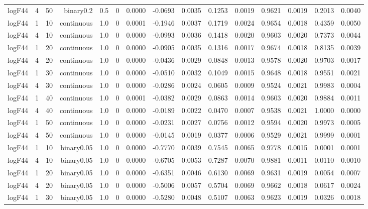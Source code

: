 \begin{longtable}{rrrrrrrrrrrrrrr}
  logF44 & 4 & 50 & binary0.2 & 0.5 & 0 & 0.0000 & -0.0693 & 0.0035 & 0.1253 & 0.0019 & 0.9621 & 0.0019 & 0.2013 & 0.0040 \\ 
  logF44 & 1 & 10 & continuous & 1.0 & 0 & 0.0001 & -0.1946 & 0.0037 & 0.1719 & 0.0024 & 0.9654 & 0.0018 & 0.4359 & 0.0050 \\ 
  logF44 & 4 & 10 & continuous & 1.0 & 0 & 0.0000 & -0.0993 & 0.0036 & 0.1418 & 0.0020 & 0.9603 & 0.0020 & 0.7373 & 0.0044 \\ 
  logF44 & 1 & 20 & continuous & 1.0 & 0 & 0.0000 & -0.0905 & 0.0035 & 0.1316 & 0.0017 & 0.9674 & 0.0018 & 0.8135 & 0.0039 \\ 
  logF44 & 4 & 20 & continuous & 1.0 & 0 & 0.0000 & -0.0436 & 0.0029 & 0.0848 & 0.0013 & 0.9578 & 0.0020 & 0.9703 & 0.0017 \\ 
  logF44 & 1 & 30 & continuous & 1.0 & 0 & 0.0000 & -0.0510 & 0.0032 & 0.1049 & 0.0015 & 0.9648 & 0.0018 & 0.9551 & 0.0021 \\ 
  logF44 & 4 & 30 & continuous & 1.0 & 0 & 0.0000 & -0.0286 & 0.0024 & 0.0605 & 0.0009 & 0.9524 & 0.0021 & 0.9983 & 0.0004 \\ 
  logF44 & 1 & 40 & continuous & 1.0 & 0 & 0.0001 & -0.0382 & 0.0029 & 0.0863 & 0.0014 & 0.9603 & 0.0020 & 0.9884 & 0.0011 \\ 
  logF44 & 4 & 40 & continuous & 1.0 & 0 & 0.0000 & -0.0189 & 0.0022 & 0.0470 & 0.0007 & 0.9538 & 0.0021 & 1.0000 & 0.0000 \\ 
  logF44 & 1 & 50 & continuous & 1.0 & 0 & 0.0000 & -0.0231 & 0.0027 & 0.0756 & 0.0012 & 0.9594 & 0.0020 & 0.9973 & 0.0005 \\ 
  logF44 & 4 & 50 & continuous & 1.0 & 0 & 0.0000 & -0.0145 & 0.0019 & 0.0377 & 0.0006 & 0.9529 & 0.0021 & 0.9999 & 0.0001 \\ 
  logF44 & 1 & 10 & binary0.05 & 1.0 & 0 & 0.0000 & -0.7770 & 0.0039 & 0.7545 & 0.0065 & 0.9778 & 0.0015 & 0.0001 & 0.0001 \\ 
  logF44 & 4 & 10 & binary0.05 & 1.0 & 0 & 0.0000 & -0.6705 & 0.0053 & 0.7287 & 0.0070 & 0.9881 & 0.0011 & 0.0110 & 0.0010 \\ 
  logF44 & 1 & 20 & binary0.05 & 1.0 & 0 & 0.0000 & -0.6351 & 0.0046 & 0.6130 & 0.0069 & 0.9631 & 0.0019 & 0.0054 & 0.0007 \\ 
  logF44 & 4 & 20 & binary0.05 & 1.0 & 0 & 0.0000 & -0.5006 & 0.0057 & 0.5704 & 0.0069 & 0.9662 & 0.0018 & 0.0617 & 0.0024 \\ 
  logF44 & 1 & 30 & binary0.05 & 1.0 & 0 & 0.0000 & -0.5280 & 0.0048 & 0.5107 & 0.0063 & 0.9623 & 0.0019 & 0.0326 & 0.0018 \\ 

\end{longtable}
